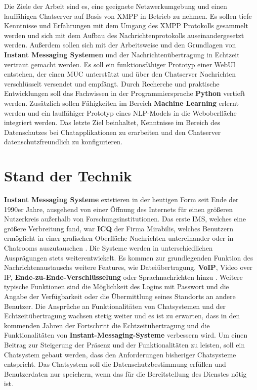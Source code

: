 \documentclass[a4paper,titlepage,halfparskip,12pt]{scrreprt}
\begin{document}
\begin{onehalfspacing}
Die Ziele der Arbeit sind es, eine geeignete Netzwerkumgebung und einen lauffähigen Chatserver auf Basis von \ac{XMPP} in Betrieb zu nehmen. Es sollen tiefe Kenntnisse und Erfahrungen mit dem Umgang des \ac{XMPP} Protokolls gesammelt werden und sich mit dem Aufbau des Nachrichtenprotokolls auseinandergesetzt werden. Außerdem sollen sich mit der Arbeitsweise und den Grundlagen von \textbf{Instant Messaging Systemen} und der Nachrichtenübertragung in Echtzeit vertraut gemacht werden. Es soll ein funktionsfähiger Prototyp einer WebUI entstehen, der einen \ac{MUC} unterstützt und über den Chatserver Nachrichten verschlüsselt versendet und empfängt. Durch Recherche und praktische Entwicklungen soll das Fachwissen in der Programmiersprache \textbf{Python} vertieft werden. Zusätzlich sollen Fähigkeiten im Bereich \textbf{Machine Learning} erlernt werden und ein lauffähiger Prototyp eines \ac{NLP}-Models in die Weboberfläche integriert werden. Das letzte Ziel beinhaltet, Kenntnisse im Bereich des Datenschutzes bei Chatapplikationen zu erarbeiten und den Chatserver datenschutzfreundlich zu konfigurieren.

\section{Stand der Technik}
\label{sec:StandDerTechnik}

\textbf{Instant Messaging Systeme} existieren in der heutigen Form seit Ende der 1990er Jahre, ausgehend von einer Öffnung des Internets für einen größeren Nutzerkreis außerhalb von Forschungsinstitutionen. Das erste \ac{IMS}, welches eine größere Verbreitung fand, war \textbf{\ac{ICQ}} der Firma Mirabilis, welches Benutzern ermöglicht in einer grafischen Oberfläche Nachrichten untereinander oder in Chatrooms auszutauschen \cite{ICQ}. Die Systeme werden in unterschiedlichen Ausprägungen stets weiterentwickelt. Es kommen zur grundlegenden Funktion des Nachrichtenaustauschs weitere Features, wie Dateiübertragung, \textbf{\ac{VoIP}}, Video over IP, \textbf{Ende-zu-Ende-Verschlüsselung} oder Sprachnachrichten hinzu \cite{gross2007}. 
Weitere typische Funktionen sind die Möglichkeit des Logins mit Passwort und die Angabe der Verfügbarkeit oder die Übermittlung seines Standorts an andere Benutzer. Die Ansprüche an Funktionalitäten von Chatsystemen und der Echtzeitübertragung wachsen stetig weiter und es ist zu erwarten, dass in den kommenden Jahren der Fortschritt die Echtzeitübertragung und die Funktionalitäten von \textbf{Instant-Messaging-Systeme} verbessern wird. Um einen Beitrag zur Steigerung der Präsenz und der Funktionalitäten zu leisten, soll ein Chatsystem gebaut werden, dass den Anforderungen bisheriger Chatsysteme entspricht. Das Chatsystem soll die Datenschutzbestimmung erfüllen und Benutzerdaten nur speichern, wenn das für die Bereitstellung des Dienstes nötig ist.\cite{anastasiaIMS}
\newpage


\end{onehalfspacing}
\end{document}
